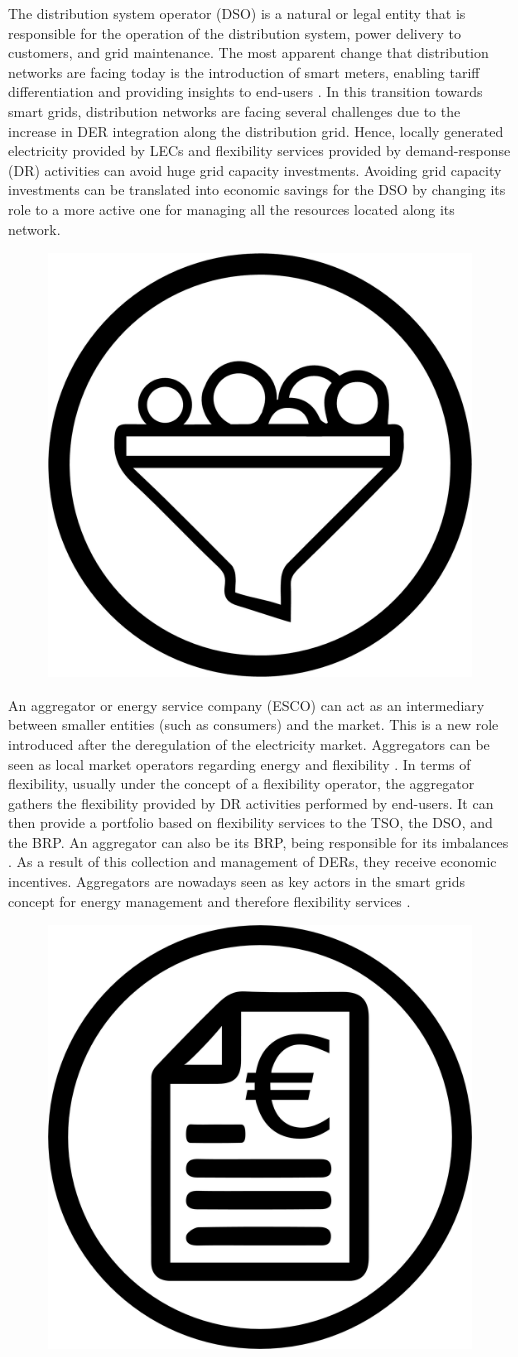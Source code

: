 The distribution system operator (DSO) is a natural or legal entity that is responsible for the operation of the distribution system, power delivery to customers, and grid maintenance. The most apparent change that distribution networks are facing today is the introduction of smart meters, enabling tariff differentiation and providing insights to end-users \cite{USEFFoundation2015a}.
In this transition towards smart grids, distribution networks are facing several challenges due to the increase in DER integration along the distribution grid. Hence, locally generated electricity provided by LECs and flexibility services provided by demand-response (DR) activities can avoid huge grid capacity investments. Avoiding grid capacity investments can be translated into economic savings for the DSO by changing its role to a more active one for managing all the resources located along its network.\\

\begin{figure}
	\centering
	\includegraphics[width=0.1\columnwidth ]{ChapterIntro/Figures/Aggregator.jpg}
	\label{Aggregator}  
\end{figure}

An aggregator or energy service company (ESCO) can act as an intermediary between smaller entities (such as consumers) and the market. This is a new role introduced after the deregulation of the electricity market. Aggregators can be seen as local market operators regarding energy and flexibility \cite{Olivella2018}. In terms of flexibility, usually under the concept of a flexibility operator, the aggregator gathers the flexibility provided by DR activities performed by end-users. It can then provide a portfolio based on flexibility services to the TSO, the DSO, and the BRP. An aggregator can also be its BRP, being responsible for its imbalances \cite{VILLAR2018Flexibility}. As a result of this collection and management of DERs, they receive economic incentives. Aggregators are nowadays seen as key actors in the smart grids concept for energy management and therefore flexibility services \cite{Carreiro2017}.\\

\begin{figure}
	\centering
	\includegraphics[width=0.1\columnwidth ]{ChapterIntro/Figures/bill.jpg}
	\label{retailer}  
\end{figure}


